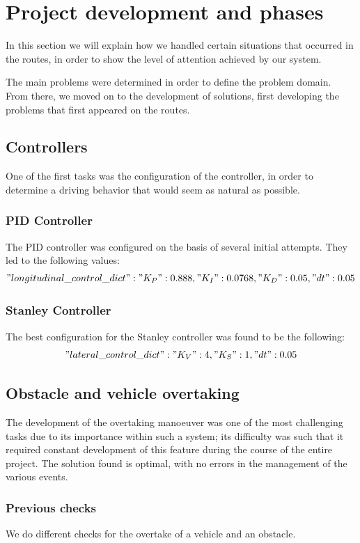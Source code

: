 \documentclass{article}
\begin{document}
\section{Project development and phases }
In this section we will explain how we handled certain situations that occurred in the routes,
in order to show the level of attention achieved by our system.

The main problems were determined in order to define the problem domain.
From there, we moved on to the development of solutions, first developing the problems that first appeared on the routes.
\subsection{Controllers}
One of the first tasks was the configuration of the controller, in order to determine a driving behavior that
would seem as natural as possible.
\subsubsection{PID Controller}
The PID controller was configured on the basis of several initial attempts. They led to the following values:
$$"longitudinal\_control\_dict" : {"K_P": 0.888 , "K_I": 0.0768, "K_D": 0.05, "dt": 0.05}$$

\subsubsection{Stanley Controller}
The best configuration for the Stanley controller was found to be the following:
$$"lateral\_control\_dict" : {"K_V": 4, "K_S": 1, "dt": 0.05}$$

\subsection{Obstacle and vehicle overtaking}
The development of the overtaking manoeuver was one of the most challenging tasks due to its importance
within such a system; its difficulty was such that it required constant development of this feature during
the course of the entire project. The solution found is optimal, with no errors in the management of the
various events.

\subsubsection*{Previous checks}\label{checkover}
We do different checks for the overtake of a vehicle and an obstacle.
\end{document}
